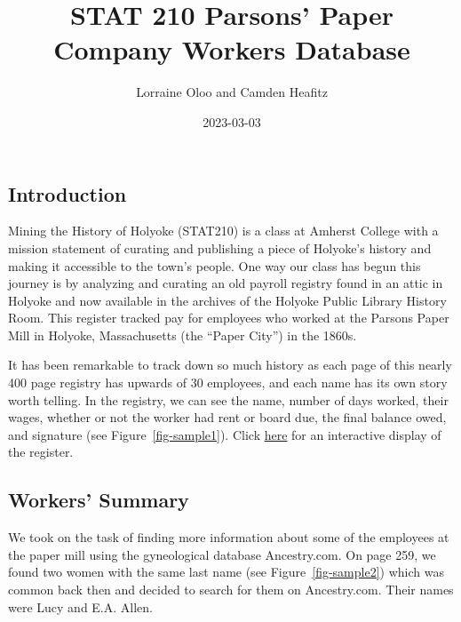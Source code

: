 \documentclass[
  letterpaper,
  DIV=11,
  numbers=noendperiod]{scrartcl}
\title{STAT 210 Parsons' Paper Company Workers Database}
\author{Lorraine Oloo and Camden Heafitz}
\date{2023-03-03}
\renewcommand*\contentsname{Table of contents}
\newcommand\contentsname{Table of contents}
\begin{document}
\maketitle
\ifdefined\Shaded\renewenvironment{Shaded}{\begin{tcolorbox}[sharp corners, frame hidden, breakable, interior hidden, enhanced, borderline west={3pt}{0pt}{shadecolor}, boxrule=0pt]}{\end{tcolorbox}}\fi

\renewcommand*\contentsname{Table of contents}
{
\hypersetup{linkcolor=}
\setcounter{tocdepth}{3}
\tableofcontents
}
\hypertarget{introduction}{%
\subsection{Introduction}\label{introduction}}

Mining the History of Holyoke (STAT210) is a class at Amherst College
with a mission statement of curating and publishing a piece of Holyoke's
history and making it accessible to the town's people. One way our class
has begun this journey is by analyzing and curating an old payroll
registry found in an attic in Holyoke and now available in the archives
of the Holyoke Public Library History Room. This register tracked pay
for employees who worked at the Parsons Paper Mill in Holyoke,
Massachusetts (the ``Paper City'') in the 1860s.

It has been remarkable to track down so much history as each page of
this nearly 400 page registry has upwards of 30 employees, and each name
has its own story worth telling. In the registry, we can see the name,
number of days worked, their wages, whether or not the worker had rent
or board due, the final balance owed, and signature (see
Figure~\ref{fig-sample1}). Click
\href{https://r.amherst.edu/apps/nhorton/Parsons-Paper/}{here} for an
interactive display of the register.

\hypertarget{workers-summary}{%
\subsection{Workers' Summary}\label{workers-summary}}

We took on the task of finding more information about some of the
employees at the paper mill using the gyneological database
Ancestry.com. On page 259, we found two women with the same last name
(see Figure~\ref{fig-sample2}) which was common back then and decided to
search for them on Ancestry.com. Their names were Lucy and E.A. Allen.
\end{document}
